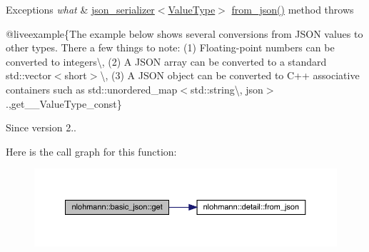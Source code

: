 \begin{DoxyExceptions}{Exceptions}
{\em what} & \mbox{\hyperlink{classnlohmann_1_1basic__json_a7768841baaaa7a21098a401c932efaff}{json\+\_\+serializer$<$\+Value\+Type$>$}} {\ttfamily \mbox{\hyperlink{namespacenlohmann_1_1detail_a839b0ab50d2c9bce669068f56bc41202}{from\+\_\+json()}}} method throws\\
\hline
\end{DoxyExceptions}
@liveexample\{The example below shows several conversions from J\+S\+ON values to other types. There a few things to note\+: (1) Floating-\/point numbers can be converted to integers\textbackslash{}, (2) A J\+S\+ON array can be converted to a standard {\ttfamily std\+::vector$<$short$>$}\textbackslash{}, (3) A J\+S\+ON object can be converted to C++ associative containers such as {\ttfamily std\+::unordered\+\_\+map$<$std\+::string\textbackslash{}, json$>$}.,get\+\_\+\+\_\+\+Value\+Type\+\_\+const\}

\begin{DoxySince}{Since}
version 2.. 
\end{DoxySince}
Here is the call graph for this function\+:\nopagebreak
\begin{figure}[H]
\begin{center}
\leavevmode
\includegraphics[width=350pt]{classnlohmann_1_1basic__json_aa6602bb24022183ab989439e19345d08_cgraph}
\end{center}
\end{figure}
\mbox{\label{classnlohmann_1_1basic__json_a5afa21d477e13fa7a3dcd7ea66c48b52}} 
